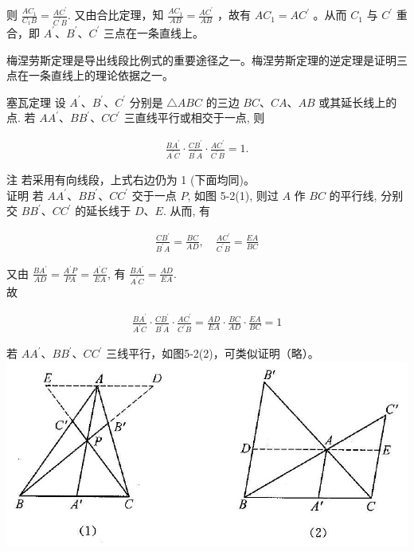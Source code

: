 \documentclass[10pt]{article}
\begin{document}
则 $\frac{A C_{1}}{C_{1} B}=\frac{A C^{\prime}}{C^{\prime} B}$. 又由合比定理，知 $\frac{A C_{1}}{A B}=\frac{A C^{\prime}}{A B}$ ，故有 $A C_{1}=A C^{\prime}$ 。从而 $C_{1}$ 与 $C^{\prime}$ 重合，即 $A^{\prime} 、 B^{\prime} 、 C^{\prime}$ 三点在一条直线上。

梅涅劳斯定理是导出线段比例式的重要途径之一。梅涅劳斯定理的逆定理是证明三点在一条直线上的理论依据之一。

塞瓦定理 设 $A^{\prime} 、 B^{\prime} 、 C^{\prime}$ 分别是 $\triangle A B C$ 的三边 $B C 、 C A 、 A B$ 或其延长线上的点. 若 $A A^{\prime} 、 B B^{\prime} 、 C C^{\prime}$ 三直线平行或相交于一点, 则

\begin{align*}
\frac{B A^{\prime}}{A^{\prime} C} \cdot \frac{C B^{\prime}}{B^{\prime} A} \cdot \frac{A C^{\prime}}{C^{\prime} B}=1 . \tag{5-3}
\end{align*}

注 若采用有向线段，上式右边仍为 1 (下面均同)。\\
证明 若 $A A^{\prime} 、 B B^{\prime} 、 C C^{\prime}$ 交于一点 $P$, 如图 5-2(1), 则过 $A$ 作 $B C$ 的平行线, 分别交 $B B^{\prime} 、 C C^{\prime}$ 的延长线于 $D 、 E$. 从而, 有

\begin{align*}
\frac{C B^{\prime}}{B^{\prime} A}=\frac{B C}{A D}, \quad \frac{A C^{\prime}}{C^{\prime} B}=\frac{E A}{B C}
\end{align*}

又由 $\frac{B A^{\prime}}{A D}=\frac{A^{\prime} P}{P A}=\frac{A^{\prime} C}{E A}$, 有 $\frac{B A^{\prime}}{A^{\prime} C}=\frac{A D}{E A}$.\\
故

\begin{align*}
\frac{B A^{\prime}}{A^{\prime} C} \cdot \frac{C B^{\prime}}{B^{\prime} A} \cdot \frac{A C^{\prime}}{C^{\prime} B}=\frac{A D}{E A} \cdot \frac{B C}{A D} \cdot \frac{E A}{B C}=1
\end{align*}

若 $A A^{\prime} 、 B B^{\prime} 、 C C^{\prime}$ 三线平行，如图5-2(2)，可类似证明（略）。\\
\includegraphics[max width=\textwidth, center]{2024_10_30_2c8f45efd4a519b08e1ag-047(1)}
\end{document}
